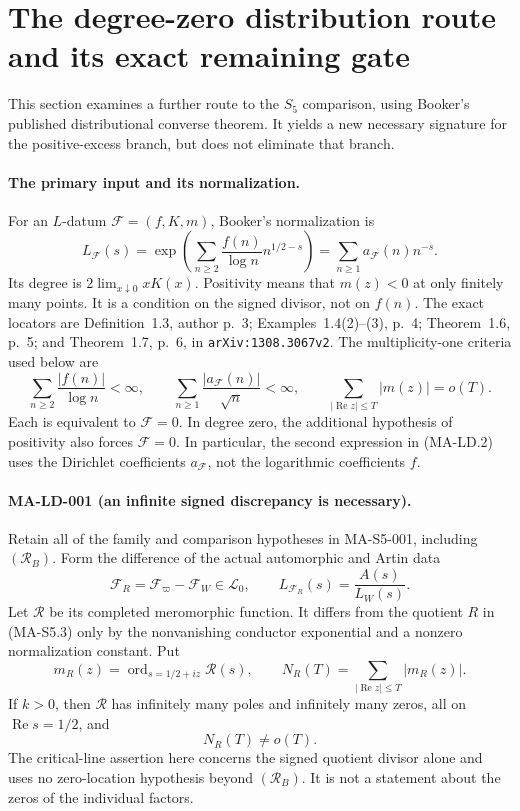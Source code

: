\section{The degree-zero distribution route and its exact remaining gate}
\label{sec:booker-route}

This section examines a further route to the $S_5$ comparison, using
Booker's published distributional converse theorem. It yields a new
necessary signature for the positive-excess branch, but does not
eliminate that branch.

\paragraph{The primary input and its normalization.}
For an $L$-datum $\mathcal F=(f,K,m)$, Booker's normalization is
\[
 L_{\mathcal F}(s)
 =\exp\left(\sum_{n\ge2}\frac{f(n)}{\log n}
                              n^{1/2-s}\right)
 =\sum_{n\ge1}a_{\mathcal F}(n)n^{-s}.
 \tag{MA-LD.1}
\]
Its degree is $2\lim_{x\downarrow0}xK(x)$. Positivity means that
$m(z)<0$ at only finitely many points. It is a condition on the
signed divisor, not on $f(n)$. The exact locators are Definition~1.3,
author p.~3; Examples~1.4(2)--(3), p.~4; Theorem~1.6, p.~5;
and Theorem~1.7, p.~6, in \texttt{arXiv:1308.3067v2}.
The multiplicity-one criteria used below are
\[
 \sum_{n\ge2}\frac{|f(n)|}{\log n}<\infty,
 \qquad
 \sum_{n\ge1}\frac{|a_{\mathcal F}(n)|}{\sqrt n}<\infty,
 \qquad
 \sum_{|\operatorname{Re}z|\le T}|m(z)|=o(T).
 \tag{MA-LD.2}
\]
Each is equivalent to $\mathcal F=0$. In degree zero, the additional
hypothesis of positivity also forces $\mathcal F=0$.
In particular, the second expression in (MA-LD.2) uses the
Dirichlet coefficients $a_{\mathcal F}$, not the logarithmic
coefficients $f$.

\paragraph{MA-LD-001 (an infinite signed discrepancy is necessary).}
Retain all of the family and comparison hypotheses in MA-S5-001,
including $(\mathcal R_B)$. Form the difference of the actual
automorphic and Artin data
\[
 \mathcal F_R=\mathcal F_{\varpi}-\mathcal F_W\in\mathcal L_0,
 \qquad L_{\mathcal F_R}(s)=\frac{A(s)}{L_W(s)}.
 \tag{MA-LD.3}
\]
Let $\mathscr R$ be its completed meromorphic function. It differs
from the quotient $R$ in (MA-S5.3) only by the nonvanishing
conductor exponential and a nonzero normalization constant.
Put
\[
 m_R(z)=\operatorname{ord}_{s=1/2+iz}\mathscr R(s),\qquad
 N_R(T)=\sum_{|\operatorname{Re}z|\le T}|m_R(z)|.
 \tag{MA-LD.4}
\]
If $k>0$, then $\mathscr R$ has infinitely many poles and infinitely
many zeros, all on $\operatorname{Re}s=1/2$, and
\[
                       N_R(T)\ne o(T).
 \tag{MA-LD.5}
\]
The critical-line assertion here concerns the signed quotient
divisor alone and uses no zero-location hypothesis beyond
$(\mathcal R_B)$. It is not a statement about the zeros of the
individual factors.

